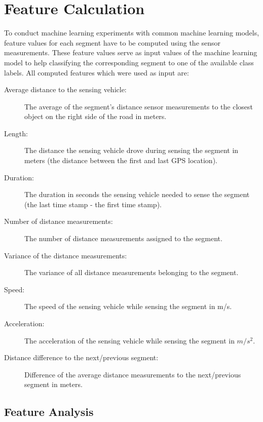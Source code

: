 \section{Feature Calculation}
\label{sec:feature_calculation}

To conduct machine learning experiments with common machine learning models, feature values for each segment have to be computed using the sensor measurements. These feature values serve as input values of the machine learning model to help classifying the corresponding segment to one of the available class labels. All computed features which were used as input are:

\begin{description}

\item[Average distance to the sensing vehicle:] The average of the segment's distance sensor measurements to the closest object on the right side of the road in meters.

\item[Length:] The distance the sensing vehicle drove during sensing the segment in meters (the distance between the first and last GPS location).

\item[Duration:] The duration in seconds the sensing vehicle needed to sense the segment (the last time stamp - the first time stamp).

\item[Number of distance measurements:] The number of distance measurements assigned to the segment.

\item[Variance of the distance measurements:] The variance of all distance measurements belonging to the segment.

\item[Speed:] The speed of the sensing vehicle while sensing the segment in m/s.

\item[Acceleration:] The acceleration of the sensing vehicle while sensing the segment in $m/s^2$.

\item[Distance difference to the next/previous segment:] Difference of the average distance measurements to the next/previous segment in meters.

\end{description}


\subsection{Feature Analysis}

